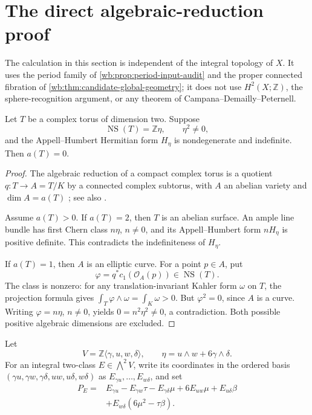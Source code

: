 \section{The direct algebraic-reduction proof}
\label{wb:sec:algebraic-dimension}

The calculation in this section is independent of the integral topology of
\(X\).  It uses the period family of
\cref{wb:prop:period-input-audit} and the proper connected fibration of
\cref{wb:thm:candidate-global-geometry}; it does not use \(H^2(X;\mathbb Z)\),
the sphere-recognition argument, or any theorem of
Campana--Demailly--Peternell.

\begin{lemma}
\label{wb:lem:torus-algebraic-reduction-audit}
Let \(T\) be a complex torus of dimension two.  Suppose
\[
 \operatorname{NS}(T)=\mathbb Z\eta,\qquad \eta^2\ne0,
\]
and the Appell--Humbert Hermitian form \(H_\eta\) is nondegenerate and
indefinite.  Then \(a(T)=0\).
\end{lemma}

\begin{proof}
The algebraic reduction of a compact complex torus is a quotient
\(q:T\to A=T/K\) by a connected complex subtorus, with \(A\) an abelian
variety and \(\dim A=a(T)\)
\cite[Chapter~2, \S6]{BirkenhakeLange1999}; see also
\cite[\S8, p.~2437]{PareschiPopaSchnell2017}.

Assume \(a(T)>0\).  If \(a(T)=2\), then \(T\) is an abelian surface.  An
ample line bundle has first Chern class \(n\eta\), \(n\ne0\), and its
Appell--Humbert form \(nH_\eta\) is positive definite.  This contradicts
the indefiniteness of \(H_\eta\).

If \(a(T)=1\), then \(A\) is an elliptic curve.  For a point \(p\in A\),
put
\[
 \varphi=q^*c_1(\mathcal O_A(p))\in\operatorname{NS}(T).
\]
The class is nonzero: for any translation-invariant Kahler form \(\omega\)
on \(T\), the projection formula gives
\(\int_T\varphi\wedge\omega=\int_K\omega>0\).  But
\(\varphi^2=0\), since \(A\) is a curve.  Writing
\(\varphi=n\eta\), \(n\ne0\), yields
\(0=n^2\eta^2\ne0\), a contradiction.  Both possible positive algebraic
dimensions are excluded.
\end{proof}

Let
\[
 V=\mathbb Z\langle\gamma,u,w,\delta\rangle,
 \qquad
 \eta=u\wedge w+6\gamma\wedge\delta.
\]
For an integral two-class \(E\in\bigwedge^2V\), write its coordinates in
the ordered basis
\((\gamma u,\gamma w,\gamma\delta,uw,u\delta,w\delta)\) as
\(E_{\gamma u},\ldots,E_{w\delta}\), and set
\[
\begin{aligned}
P_E={}&E_{\gamma u}-E_{\gamma w}\tau-E_{\gamma\delta}\mu
 +6E_{uw}\mu+E_{u\delta}\beta\\
&+E_{w\delta}(6\mu^2-\tau\beta).
\end{aligned}
\tag{3.1}
\]

